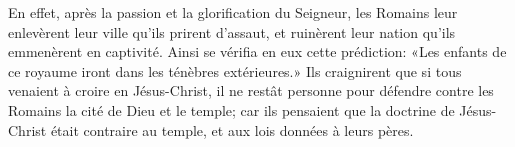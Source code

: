  En effet, après la passion et la glorification du Seigneur,
	les Romains leur enlevèrent leur ville qu’ils prirent d’assaut,
	et ruinèrent leur nation qu’ils emmenèrent en captivité.
Ainsi se vérifia en eux cette prédiction:
	«Les enfants de ce royaume iront dans les ténèbres extérieures.»
Ils craignirent que si tous venaient à croire en Jésus-Christ,
	il ne restât personne
		pour défendre contre les Romains la cité de Dieu et le temple;
	car ils pensaient que la doctrine de Jésus-Christ était contraire au temple,
	et aux lois données à leurs pères.
